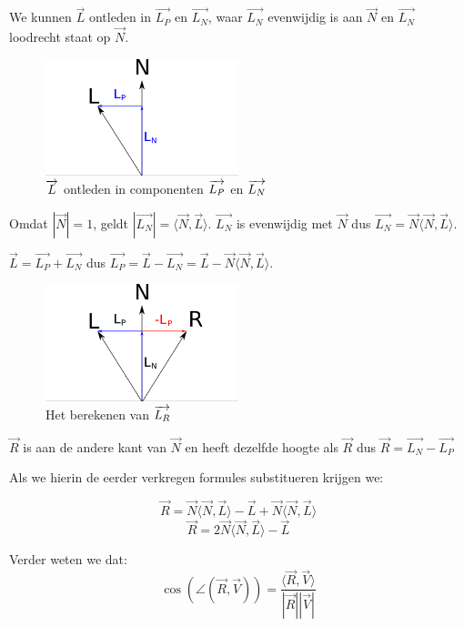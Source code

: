 \documentclass[12pt, a4paper]{article}
\newcommand*{\ora}{\overrightarrow}
\begin{document}
We kunnen $\ora{L}$ ontleden in $\ora{L_P}$ en $\ora{L_N}$, waar $\ora{L_N}$ evenwijdig is aan $\ora{N}$ en $\ora{L_N}$ loodrecht staat op $\ora{N}$.

\begin{figure}[h]
    \centering
    \includegraphics[width=0.50\textwidth]{L_decomposition.png}
    \caption{$\protect\overrightarrow{L}$ ontleden in componenten $\protect\overrightarrow{L_P}$ en $\protect\overrightarrow{L_N}$}
    \label{fig:L_decomposition}
\end{figure}

Omdat $\left|\ora{N}\right| = 1$, geldt $\left|\ora{L_N}\right|=\langle\ora{N},\ora{L}\rangle$. $\ora{L_N}$ is evenwijdig met $\ora{N}$ dus $\ora{L_N}=\ora{N}\langle\ora{N},\ora{L}\rangle$.

$\ora{L}=\ora{L_P}+\ora{L_N}$ dus $\ora{L_P}=\ora{L}-\ora{L_N}=\ora{L}-\ora{N}\langle\ora{N},\ora{L}\rangle$.

\begin{figure}[h]
    \centering
    \includegraphics[width=0.50\textwidth]{LR_Calculation.png}
    \caption{Het berekenen van $\protect\ora{L_R}$}
    \label{fig:LR_Calculation}
\end{figure}

$\ora{R}$ is aan de andere kant van $\ora{N}$ en heeft dezelfde hoogte als $\ora{R}$ dus $\ora{R}=\ora{L_N}-\ora{L_P}$

Als we hierin de eerder verkregen formules substitueren krijgen we:

\[\ora{R}=\ora{N}\langle\ora{N},\ora{L}\rangle-\ora{L}+\ora{N}\langle\ora{N},\ora{L}\rangle\]
\[\ora{R}=2\ora{N}\langle\ora{N},\ora{L}\rangle-\ora{L}\]

Verder weten we dat:
\[\cos\left(\angle\left(\ora{R}, \ora{V}\right)\right)=\frac{\langle\ora{R},\ora{V}\rangle}{\left|\ora{R}\right|\left|\ora{V}\right|}\]
\end{document}
